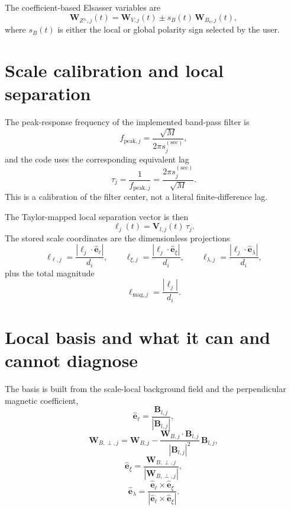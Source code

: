 \documentclass[11pt]{article}
\begin{document}
The coefficient-based Elsasser variables are
\begin{equation}
 \mathbf{W}_{Z^{\pm},j}(t) = \mathbf{W}_{V,j}(t) \pm s_B(t)\,\mathbf{W}_{B_v,j}(t),
\end{equation}
where $s_B(t)$ is either the local or global polarity sign selected by the user.

\section{Scale calibration and local separation}

The peak-response frequency of the implemented band-pass filter is
\begin{equation}
 f_{\mathrm{peak},j} = \frac{\sqrt{M}}{2\pi s_j^{(\mathrm{sec})}},
\end{equation}
and the code uses the corresponding equivalent lag
\begin{equation}
 \tau_j = \frac{1}{f_{\mathrm{peak},j}} = \frac{2\pi s_j^{(\mathrm{sec})}}{\sqrt{M}}.
\end{equation}
This is a calibration of the filter center, not a literal finite-difference lag.

The Taylor-mapped local separation vector is then
\begin{equation}
 \bm{\ell}_j(t) = \mathbf{V}_{l,j}(t)\,\tau_j.
\end{equation}
The stored scale coordinates are the dimensionless projections
\begin{equation}
 \ell_{\ell,j} = \frac{|\bm{\ell}_j\cdot\hat{\mathbf e}_{\ell}|}{d_i},\qquad
 \ell_{\xi,j} = \frac{|\bm{\ell}_j\cdot\hat{\mathbf e}_{\xi}|}{d_i},\qquad
 \ell_{\lambda,j} = \frac{|\bm{\ell}_j\cdot\hat{\mathbf e}_{\lambda}|}{d_i},
\end{equation}
plus the total magnitude
\begin{equation}
 \ell_{\mathrm{mag},j} = \frac{|\bm{\ell}_j|}{d_i}.
\end{equation}

\section{Local basis and what it can and cannot diagnose}

The basis is built from the scale-local background field and the perpendicular magnetic coefficient,
\begin{equation}
 \hat{\mathbf e}_{\ell} = \frac{\mathbf{B}_{l,j}}{|\mathbf{B}_{l,j}|},
\end{equation}
\begin{equation}
 \mathbf{W}_{B,\perp,j} = \mathbf{W}_{B,j} - \frac{\mathbf{W}_{B,j}\cdot\mathbf{B}_{l,j}}{|\mathbf{B}_{l,j}|^2}\,\mathbf{B}_{l,j},
\end{equation}
\begin{equation}
 \hat{\mathbf e}_{\xi} = \frac{\mathbf{W}_{B,\perp,j}}{|\mathbf{W}_{B,\perp,j}|},
\end{equation}
\begin{equation}
 \hat{\mathbf e}_{\lambda} = \frac{\hat{\mathbf e}_{\ell}\times\hat{\mathbf e}_{\xi}}{|\hat{\mathbf e}_{\ell}\times\hat{\mathbf e}_{\xi}|}.
\end{equation}
\end{document}
